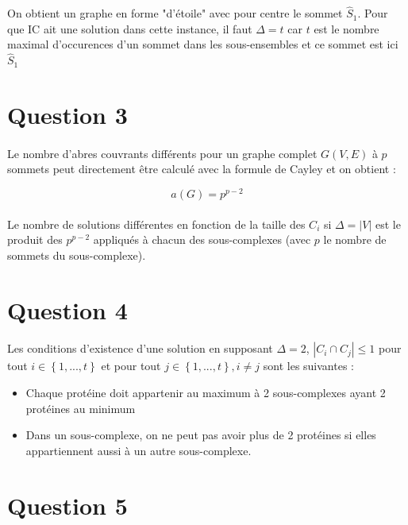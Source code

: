 \documentclass[11pt]{article}
\begin{document}
On obtient un graphe en forme "d'étoile" avec pour centre le sommet $\widehat{S}_1$. Pour que IC ait une solution
dans cette instance, il faut $\Delta = t$ car $t$ est le nombre maximal d'occurences d'un sommet dans les sous-ensembles
et ce sommet est ici $\widehat{S}_1$

\section{Question 3}
\paragraph{}
Le nombre d'abres couvrants différents pour un graphe complet $G(V,E)$ à $p$ sommets peut directement être calculé
avec la formule de Cayley et on obtient :

\begin{equation}
	a(G) = p^{p-2} 
\end{equation}

\paragraph{}
Le nombre de solutions différentes en fonction de la taille des $C_i$ si $\Delta = |V|$
est le produit des $p^{p-2}$ appliqués à chacun des sous-complexes (avec $p$ le 
nombre de sommets du sous-complexe).

\section{Question 4}
\paragraph{}
Les conditions d'existence d'une solution en supposant $\Delta=2$, $|C_i \cap C_j| \leq 1$ pour tout $i \in \left\{1,...,t\right\}$ et pour tout
$j \in \left\{1,...,t\right\} , i\ne j$ sont les suivantes :
\begin{itemize}
    \item Chaque protéine doit appartenir au maximum à 2 sous-complexes ayant
2 protéines au minimum
    \item Dans un sous-complexe, on ne peut pas avoir plus de 2 protéines si elles
appartiennent aussi à un autre sous-complexe.
\end{itemize}
\section{Question 5}
\end{document}

